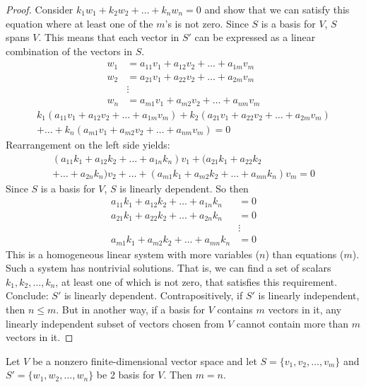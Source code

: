 \documentclass[12pt]{article}
\begin{document}
\begin{proof} Consider $k_1w_1 + k_2w_2 + \dots + k_nw_n = 0 $ and show that we can satisfy this equation where at least one of the $m$'s is not zero. Since $S$ is a basis for $V$, $S$ spans $V$. This means that each vector in $S'$ can be expressed as a linear combination of the vectors in $S$. $$\begin{aligned} w_1 &= a_{11}v_1 + a_{12}v_2 + \dots + a_{1m}v_m \\ w_2 &= a_{21}v_1 + a_{22}v_2 + \dots + a_{2m}v_m \\ &\vdots \\ w_n &= a_{m1}v_1 + a_{m2}v_2 + \dots + a_{nm}v_m \end{aligned} $$ 
 \begin{multline*} k_1(a_{11}v_1 + a_{12}v_2 + \dots + a_{1m}v_m) + k_2(a_{21}v_1 + a_{22}v_2 + \dots + a_{2m}v_m) \\ + \dots + k_n(a_{m1}v_1 + a_{m2}v_2 + \dots + a_{nm}v_m) = 0 \end{multline*} 
Rearrangement on the left side yields: \begin{multline*} (a_{11}k_1 + a_{12}k_2 + \dots + a_{1n}k_n)v_1 + (a_{21}k_1 + a_{22}k_2 \\ + \dots + a_{2n}k_n)v_2 + \dots + (a_{m1}k_1 + a_{m2}k_2 + \dots + a_{mn}k_n)v_m = 0 \end{multline*} Since $S$ is a basis for $V$, $S$ is linearly dependent. So then $$ \begin{aligned} a_{11}k_1 + a_{12}k_2 + \dots + a_{1n}k_n &= 0 \\ a_{21}k_1 + a_{22}k_2 + \dots + a_{2n}k_n &= 0 \\ &\vdots \\ a_{m1}k_1 + a_{m2}k_2 + \dots + a_{mn}k_n &= 0 \end{aligned} $$ This is a homogeneous linear system with more variables ($n$) than equations ($m$). Such a system has nontrivial solutions. That is, we can find a set of scalars $k_1, k_2, \dots, k_n$, at least one of which is not zero, that satisfies this requirement. Conclude: $S'$ is linearly dependent. \newline Contrapositively, if $S'$ is linearly independent, then $n \leq m$. But in another way, if a basis for $V$ contains $m$ vectors in it, any linearly independent subset of vectors chosen from $V$ cannot contain more than $m$ vectors in it. \end{proof} 
\begin{theorem} Let $V$ be a nonzero finite-dimensional vector space and let $S = \{v_1, v_2, \dots, v_m\}$ and $S' = \{w_1, w_2, \dots, w_n\}$ be 2 basis for $V$. Then $m = n$. \end{theorem} 
\end{document}
